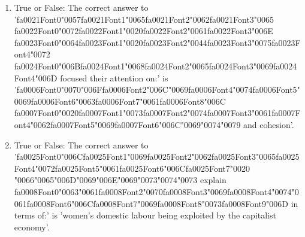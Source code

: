 \documentclass[12pt]{article}
\begin{document}
\begin{enumerate}[label=\arabic*.]
\item True or False: The correct answer to '{\csname fa0021Font0\endcsname\char"0057}{\csname fa0021Font1\endcsname\char"0065}{\csname fa0021Font2\endcsname\char"0062}{\csname fa0021Font3\endcsname\char"0065} {\csname fa0022Font0\endcsname\char"0072}{\csname fa0022Font1\endcsname\char"0020}{\csname fa0022Font2\endcsname\char"0061}{\csname fa0022Font3\endcsname\char"006E} {\csname fa0023Font0\endcsname\char"0064}{\csname fa0023Font1\endcsname\char"0020}{\csname fa0023Font2\endcsname\char"0044}{\csname fa0023Font3\endcsname\char"0075}{\csname fa0023Font4\endcsname\char"0072} {\csname fa0024Font0\endcsname\char"006B}{\csname fa0024Font1\endcsname\char"0068}{\csname fa0024Font2\endcsname\char"0065}{\csname fa0024Font3\endcsname\char"0069}{\csname fa0024Font4\endcsname\char"006D} focused their attention on:' is '{\csname fa0006Font0\endcsname\char"0070}{\char"006F}{\csname fa0006Font2\endcsname\char"006C}{\char"0069}{\csname fa0006Font4\endcsname\char"0074}{\csname fa0006Font5\endcsname\char"0069}{\csname fa0006Font6\endcsname\char"0063}{\csname fa0006Font7\endcsname\char"0061}{\csname fa0006Font8\endcsname\char"006C} {\csname fa0007Font0\endcsname\char"0020}{\csname fa0007Font1\endcsname\char"0073}{\csname fa0007Font2\endcsname\char"0074}{\csname fa0007Font3\endcsname\char"0061}{\csname fa0007Font4\endcsname\char"0062}{\csname fa0007Font5\endcsname\char"0069}{\csname fa0007Font6\endcsname\char"006C}{\char"0069}{\char"0074}{\char"0079} and cohesion'.
\item True or False: The correct answer to '{\csname fa0025Font0\endcsname\char"006C}{\csname fa0025Font1\endcsname\char"0069}{\csname fa0025Font2\endcsname\char"0062}{\csname fa0025Font3\endcsname\char"0065}{\csname fa0025Font4\endcsname\char"0072}{\csname fa0025Font5\endcsname\char"0061}{\csname fa0025Font6\endcsname\char"006C}{\csname fa0025Font7\endcsname\char"0020} {\char"0066}{\char"0065}{\char"006D}{\char"0069}{\char"006E}{\char"0069}{\char"0073}{\char"0074}{\char"0073} explain {\csname fa0008Font0\endcsname\char"0063}{\char"0061}{\csname fa0008Font2\endcsname\char"0070}{\csname fa0008Font3\endcsname\char"0069}{\csname fa0008Font4\endcsname\char"0074}{\char"0061}{\csname fa0008Font6\endcsname\char"006C}{\csname fa0008Font7\endcsname\char"0069}{\csname fa0008Font8\endcsname\char"0073}{\csname fa0008Font9\endcsname\char"006D} in terms of:' is 'women's domestic labour being exploited by the capitalist economy'.

\end{enumerate}
\end{document}
